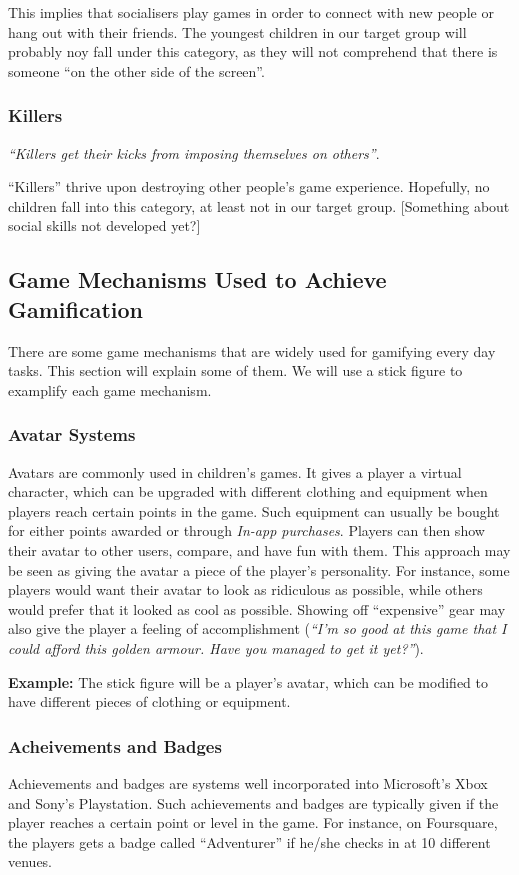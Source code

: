 This implies that socialisers play games in order to connect with new people or hang out with their friends. The youngest children in our target group will probably noy fall under this category, as they will not comprehend that there is someone ``on the other side of the screen''.    

\subsubsection{Killers}
\label{sec:killers}
\textit{``Killers get their kicks from imposing themselves on others''}\cite{bartle-gamers}.

``Killers'' thrive upon destroying other people's game experience. Hopefully, no children fall into this category, at least not in our target group. [Something about social skills not developed yet?] 

\subsection{Game Mechanisms Used to Achieve Gamification} 
There are some game mechanisms that are widely used for gamifying every day tasks. This section will explain some of them. We will use a stick figure to examplify each game mechanism. 

\subsubsection{Avatar Systems}
Avatars are commonly used in children's games. It gives a player a virtual character, which can be upgraded with different clothing and equipment when players reach certain points in the game. Such equipment can usually be bought for either points awarded or through \emph{In-app purchases}. Players can then show their avatar to other users, compare, and have fun with them. This approach may be seen as giving the avatar a piece of the player's personality. For instance, some players would want their avatar to look as ridiculous as possible, while others would prefer that it looked as cool as possible. Showing off ``expensive'' gear may also give the player a feeling of accomplishment (\emph{``I'm so good at this game that I could afford this golden armour. Have you managed to get it yet?''}). 

\textbf{Example:} The stick figure will be a player's avatar, which can be modified to have different pieces of clothing or equipment.  

\subsubsection{Acheivements and Badges}
Achievements and badges are systems well incorporated into Microsoft's Xbox and Sony's Playstation. Such achievements and badges are typically given if the player reaches a certain point or level in the game. For instance, on Foursquare, the players gets a badge called ``Adventurer'' if he/she checks in at 10 different venues. 

